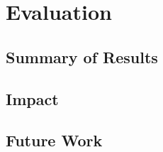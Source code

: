 \chapter{Evaluation}
\label{chap:evaluation}

\section{Summary of Results}

\section{Impact}

\section{Future Work}
